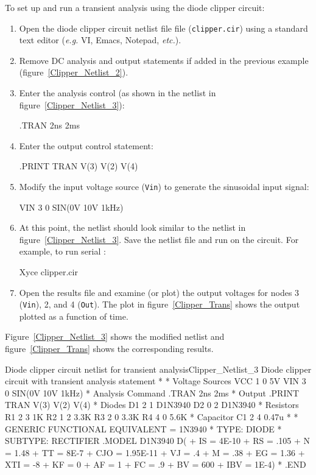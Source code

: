 To set up and run a transient analysis using the diode clipper circuit:
\begin{enumerate}
\item Open the diode clipper circuit netlist file file (\texttt{clipper.cir}) 
using a standard text editor (\emph{e.g.\/} VI, Emacs, Notepad, \emph{etc.\/}).
\item Remove DC analysis and output statements if added in the previous example (figure~\ref{Clipper_Netlist_2}).  
\item Enter the analysis control (as shown in the netlist in figure~\ref{Clipper_Netlist_3}):
\begin{vquote}
.TRAN 2ns 2ms
\end{vquote}
\item Enter the output control statement:
\begin{vquote}
.PRINT TRAN V(3) V(2) V(4)
\end{vquote}
\item Modify the input voltage source (\texttt{Vin}) to generate the 
sinusoidal input signal:
\begin{vquote}
VIN 3 0 SIN(0V 10V 1kHz)
\end{vquote}
\item 
At this point, the netlist should look similar to the netlist in figure~\ref{Clipper_Netlist_3}.  Save the netlist file and run \Xyce{} on the circuit.  For example, to run serial \Xyce{}:
\begin{vquote}
 Xyce clipper.cir
\end{vquote}
\item Open the results file and examine (or plot) the output voltages for 
nodes 3 (\texttt{Vin}), 2, and 4 (\texttt{Out}).  The plot in
  figure~\ref{Clipper_Trans} shows the output plotted as a function of time.
\end{enumerate}
Figure~\ref{Clipper_Netlist_3} shows the modified netlist and figure~\ref{Clipper_Trans} shows the
corresponding results.

\begin{NetlistFigure}{Diode clipper circuit netlist for transient analysis}{Clipper_Netlist_3}
Diode clipper circuit with transient analysis statement
*
* Voltage Sources
VCC 1 0 5V
\color{XyceRed}VIN 3 0 SIN(0V 10V 1kHz)\color{black}
* Analysis Command
\color{XyceRed}.TRAN 2ns 2ms\color{black}
* Output
\color{XyceRed}.PRINT TRAN V(3) V(2) V(4)\color{black}
* Diodes
D1 2 1 D1N3940
D2 0 2 D1N3940
* Resistors
R1 2 3 1K
R2 1 2 3.3K
R3 2 0 3.3K
R4 4 0 5.6K
* Capacitor
C1 2 4 0.47u
*
* GENERIC FUNCTIONAL EQUIVALENT = 1N3940
* TYPE:  DIODE
* SUBTYPE:  RECTIFIER
.MODEL D1N3940 D(
+         IS = 4E-10
+         RS = .105
+          N = 1.48
+         TT = 8E-7
+        CJO = 1.95E-11
+         VJ = .4
+          M = .38
+         EG = 1.36
+        XTI = -8
+         KF = 0
+         AF = 1
+         FC = .9
+         BV = 600
+        IBV = 1E-4)
*
.END

\end{NetlistFigure}

